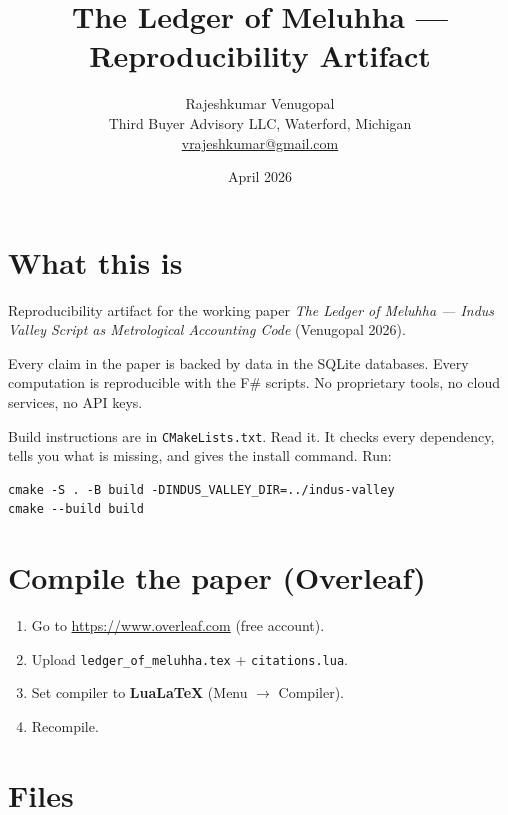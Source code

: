 \documentclass[11pt]{article}
\title{The Ledger of Meluhha --- Reproducibility Artifact}
\author{Rajeshkumar Venugopal\\
  \small Third Buyer Advisory LLC, Waterford, Michigan\\
  \small\href{mailto:vrajeshkumar@gmail.com}{vrajeshkumar@gmail.com}}
\date{April 2026}
\begin{document}
\maketitle

\section{What this is}

Reproducibility artifact for the working paper
\textit{The Ledger of Meluhha --- Indus Valley Script as
Metrological Accounting Code} (Venugopal 2026).

Every claim in the paper is backed by data in the SQLite
databases. Every computation is reproducible with the F\#
scripts. No proprietary tools, no cloud services, no API keys.

Build instructions are in \texttt{CMakeLists.txt}. Read it.
It checks every dependency, tells you what is missing, and
gives the install command. Run:

\begin{verbatim}
cmake -S . -B build -DINDUS_VALLEY_DIR=../indus-valley
cmake --build build
\end{verbatim}

\section{Compile the paper (Overleaf)}

\begin{enumerate}[nosep]
\item Go to \url{https://www.overleaf.com} (free account).
\item Upload \texttt{ledger\_of\_meluhha.tex} +
      \texttt{citations.lua}.
\item Set compiler to \textbf{LuaLaTeX} (Menu $\to$ Compiler).
\item Recompile.
\end{enumerate}

\section{Files}
\end{document}
